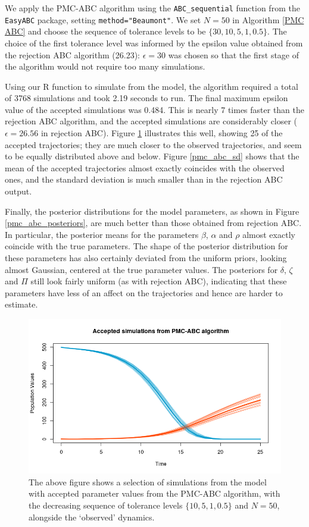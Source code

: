 \documentclass[]{article}
\begin{document}
We apply the PMC-ABC algorithm using the \texttt{ABC\_sequential} function from the \texttt{EasyABC} package, setting \texttt{method="Beaumont"}. We set $N=50$ in Algorithm \ref{PMC ABC} and choose the sequence of tolerance levels to be $\{30, 10, 5, 1, 0.5\}$. The choice of the first tolerance level was informed by the epsilon value obtained from the rejection ABC algorithm (26.23): $\epsilon=30$ was chosen so that the first stage of the algorithm would not require too many simulations. 

Using our R function to simulate from the model, the algorithm required a total of 3768 simulations and took 2.19 seconds to run. The final maximum epsilon value of the accepted simulations was 0.484. This is nearly 7 times faster than the rejection ABC algorithm, and the accepted simulations are considerably closer ($\epsilon= 26.56$ in rejection ABC). Figure \ref{pmc_abc_acc_simulations} illustrates this well, showing 25 of the accepted trajectories; they are much closer to the observed trajectories, and seem to be equally distributed above and below. Figure \ref{pmc_abc_sd} shows that the mean of the accepted trajectories almost exactly coincides with the observed ones, and the standard deviation is much smaller than in the rejection ABC output.

Finally, the posterior distributions for the model parameters, as shown in Figure \ref{pmc_abc_posteriors}, are much better than those obtained from rejection ABC. In particular, the posterior means for the parameters $\beta$, $\alpha$ and $\rho$ almost exactly coincide with the true parameters. The shape of the posterior distribution for these parameters has also certainly deviated from the uniform priors, looking almost Gaussian, centered at the true parameter values. The posteriors for $\delta$, $\zeta$ and $\Pi$ still look fairly uniform (as with rejection ABC), indicating that these parameters have less of an affect on the trajectories and hence are harder to estimate.



\begin{figure}[H]
	\centering
	\includegraphics[width=0.8\linewidth]{../Figures/PMC-ABC_simulations}
	\caption{The above figure shows a selection of simulations from the model with accepted parameter values from the PMC-ABC algorithm, with the decreasing sequence of tolerance levels $\{ 10, 5, 1, 0.5\}$ and $N=50$, alongside the `observed' dynamics.}
	\label{pmc_abc_acc_simulations}
\end{figure}
\end{document}
